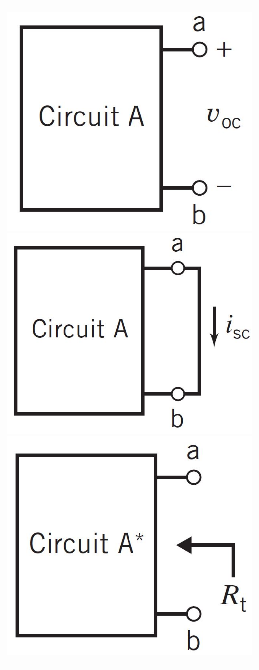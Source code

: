 \documentclass[aspectratio=169]{beamer}
\begin{document}
\begin{frame}[fragile]
\begin{tabular}{r}
\begin{columns}
\begin{column}{.5\textwidth}
		\begin{center}
    			\includegraphics[height=.3\textwidth]{figura18.JPG}	{}
			\includegraphics[height=.3\textwidth]{figura19.JPG}	{}
			\includegraphics[height=.3\textwidth]{figura20.JPG}
		 
		\end{center}	

		\end{column}

	\end{columns}

\end{tabular}

\end{frame}
\end{document}
